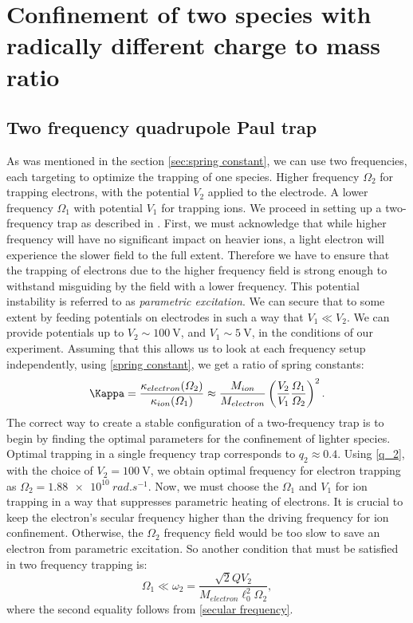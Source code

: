 \chapter{Confinement of two species with radically different charge to mass ratio}
\label{chap:math}


\section{Two frequency quadrupole Paul trap}
\label{sec:two frequency trap}

As was mentioned in the section \ref{sec:spring constant},
we can use two frequencies, each targeting to optimize the trapping of one species. Higher frequency $\Omega_2$
 for trapping electrons, with the potential $V_2$
 applied to the electrode. A lower frequency $\Omega_1$
 with potential $V_1$
 for trapping ions. We proceed in setting up a two-frequency trap as described in \cite{FOOT2018117, trypogeorgos2016cotrapping}. First, we must acknowledge that while higher frequency will have no significant impact on heavier ions, a light electron will experience the slower field to the full extent. Therefore we have to ensure that the trapping of electrons due to the higher frequency field is strong enough to withstand misguiding by the field with a lower frequency. This potential instability is referred to as \emph{parametric excitation}. We can secure that to some extent by feeding potentials on electrodes in such a way that $V_1 \ll V_2$. We can provide potentials up to $V_2 \sim \SI{100}{\volt}$, and $V_1 \sim \SI{5}{\volt}$, in the conditions of our experiment. Assuming that this allows us to look at each frequency setup independently, using \eqref{spring constant}, we get a ratio of spring constants:
\begin{equation}
	\label{two frequency ratio}
	\Kappa = \dfrac{\kappa_{electron}(\Omega_2)}{\kappa_{ion}(\Omega_1)} \approx \dfrac{M_{ion}}{M_{electron}} \left(\dfrac{V_2}{V_1}\dfrac{\Omega_1}{\Omega_2}\right)^2.
\end{equation}
The correct way to create a stable configuration of a two-frequency trap is to begin by finding the optimal parameters for the confinement of lighter species. Optimal trapping in a single frequency trap corresponds to \cite{gerlich1992inhomogeneous} $q_2 \approx 0.4$. Using \eqref{q_2}, with the choice of $V_2 = \SI{100}{\volt}$, we obtain optimal frequency for electron trapping as $\Omega_2 = \SI{1.88e10}{rad.s^{-1}}$. Now, we must choose the $\Omega_1$ and $V_1$ for ion trapping in a way that suppresses parametric heating of electrons. It is crucial to keep the electron's secular frequency higher than the driving frequency for ion confinement. Otherwise, the $\Omega_2$ frequency field would be too slow to save an electron from parametric excitation. So another condition that must be satisfied in two frequency trapping is:
\begin{equation}
	\Omega_1 \ll \omega_2 = \dfrac{\sqrt{2} Q V_2}{M_{electron} \ell_0^2 \Omega_2},
\end{equation}
where the second equality follows from \eqref{secular frequency}. 
 

